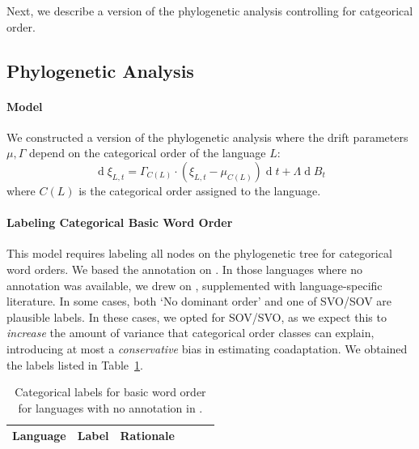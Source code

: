 \documentclass[11pt,a4paper]{article}
\begin{document}
Next, we describe a version of the phylogenetic analysis controlling for catgeorical order.

\subsection{Phylogenetic Analysis}\label{sec:categorical}


\paragraph{Model}

We constructed a version of the phylogenetic analysis where the drift parameters $\mu, \Gamma$ depend on the categorical order of the language $L$:
\begin{equation*}
    \operatorname{d}\xi_{L,t} = \Gamma_{C(L)} \cdot (\xi_{L,t}-\mu_{C(L)}) \operatorname{d}t + \Lambda \operatorname{d}B_t
\end{equation*}
where $C(L)$ is the categorical order assigned to the language.

\paragraph{Labeling Categorical Basic Word Order}
This model requires labeling all nodes on the phylogenetic tree for categorical word orders.
We based the annotation on \citet{wals-81}.
In those languages where no annotation was available, we drew on \citep{gell-mann-origin-2011}, supplemented with language-specific literature.
In some cases, both `No dominant order' and one of SVO/SOV are plausible labels. In these cases, we opted for SOV/SVO, as we expect this to \emph{increase} the amount of variance that categorical order classes can explain, introducing at most a \emph{conservative} bias in estimating coadaptation.
We obtained the labels listed in Table~\ref{tab:categorical}.

\begin{table}
\begin{tabular}{llp{}lll}
\hline
	Language & Label & Rationale \\ \hline

\hline
\end{tabular}
	\caption{Categorical labels for basic word order for languages with no annotation in \citet{wals-81}.}\label{tab:categorical}
\end{table}
%
%
\end{document}
